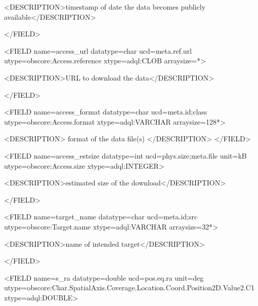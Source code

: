 \documentclass[11pt,a4paper]{ivoa}
\begin{document}
{\textless}DESCRIPTION{\textgreater}timestamp of date the data becomes publicly
available{\textless}/DESCRIPTION{\textgreater}

{\textless}/FIELD{\textgreater}

{\textless}FIELD name={\textquotedbl}access\_url{\textquotedbl} datatype={\textquotedbl}char{\textquotedbl}
ucd={\textquotedbl}meta.ref.url{\textquotedbl} utype={\textquotedbl}obscore:Access.reference{\textquotedbl}
xtype={\textquotedbl}adql:CLOB{\textquotedbl} arraysize={\textquotedbl}*{\textquotedbl}{\textgreater}

{\textless}DESCRIPTION{\textgreater}URL to download the data{\textless}/DESCRIPTION{\textgreater}

{\textless}/FIELD{\textgreater}

{\textless}FIELD name={\textquotedbl}access\_format{\textquotedbl} datatype={\textquotedbl}char{\textquotedbl}
ucd={\textquotedbl}meta.id;class{\textquotedbl} utype={\textquotedbl}obscore:Access.format{\textquotedbl}
xtype={\textquotedbl}adql:VARCHAR{\textquotedbl} arraysize={\textquotedbl}128*{\textquotedbl}{\textgreater}

 {\textless}DESCRIPTION{\textgreater} format of the data file(s) {\textless}/DESCRIPTION{\textgreater}
{\textless}/FIELD{\textgreater}

{\textless}FIELD name={\textquotedbl}access\_estsize{\textquotedbl} datatype={\textquotedbl}int{\textquotedbl}
ucd={\textquotedbl}phys.size;meta.file{\textquotedbl} unit={\textquotedbl}kB{\textquotedbl}
utype={\textquotedbl}obscore:Access.size{\textquotedbl} xtype={\textquotedbl}adql:INTEGER{\textquotedbl}{\textgreater}

 {\textless}DESCRIPTION{\textgreater}estimated size of the download{\textless}/DESCRIPTION{\textgreater}

{\textless}/FIELD{\textgreater}

{\textless}FIELD name={\textquotedbl}target\_name{\textquotedbl} datatype={\textquotedbl}char{\textquotedbl}
ucd={\textquotedbl}meta.id;src{\textquotedbl}  utype={\textquotedbl}obscore:Target.name{\textquotedbl}
xtype={\textquotedbl}adql:VARCHAR{\textquotedbl} arraysize={\textquotedbl}32*{\textquotedbl}{\textgreater}

 {\textless}DESCRIPTION{\textgreater}name of intended target{\textless}/DESCRIPTION{\textgreater}

{\textless}/FIELD{\textgreater}

{\textless}FIELD name={\textquotedbl}s\_ra{\textquotedbl} datatype={\textquotedbl}double{\textquotedbl}
ucd={\textquotedbl}pos.eq.ra{\textquotedbl} unit={\textquotedbl}deg{\textquotedbl}
utype={\textquotedbl}obscore:Char.SpatialAxis.Coverage.Location.Coord.Position2D.Value2.C1{\textquotedbl}
xtype={\textquotedbl}adql:DOUBLE{\textquotedbl}{\textgreater}
\end{document}
